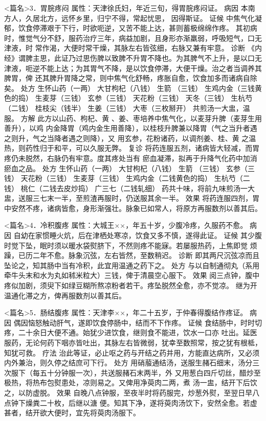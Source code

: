 \documentclass[a4paper,12pt,UTF8,twoside]{ctexbook}
\begin{document}
<篇名>3．胃脘疼闷
属性：天津徐氏妇，年近三旬，得胃脘疼闷证。 
病因 本南方人，久居北方，远怀乡里，归宁不得，常起忧思， 
因得斯证。 
证候 中焦气化凝郁，饮食停滞艰于下行，时欲呃逆，又苦不能上达，甚则蓄极绵绵作疼。 
其初病时，惟觉气分不舒，服药治疗三年，病益加剧，且身形亦渐羸弱，呼吸短气，口无津液，时 
常作渴，大便时常干燥，其脉左右皆弦细，右脉又兼有牢意。 
诊断 《内经》谓脾主思，此证乃过思伤脾以致脾不升胃不降也。为其脾气不上升，是以口无 
津液，呃逆不能上达；为其胃气不降，是以饮食停滞，大便干燥。治之者当调养其脾胃，俾 
还其脾升胃降之常，则中焦气化舒畅，疼胀自愈，饮食加多而诸病自除矣。 
处方 生怀山药（一两） 大甘枸杞（八钱） 生箭 （三钱） 
生鸡内金（三钱黄色的捣） 生麦芽（三钱） 玄参（三钱） 天花粉（三钱） 
天冬（三钱） 生杭芍（二钱） 桂枝尖（钱半） 生姜（三钱） 
大枣（三枚掰开） 
共煎汤一大盅，温服。 
方解 此方以山药、枸杞、黄 、姜、枣培养中焦气化，以麦芽升脾（麦芽生用善升），以鸡 
内金降胃（鸡内金生用善降），以桂枝升脾兼以降胃（气之当升者遇之则升，气之当降者遇之则降），又 
用玄参，花粉诸药，以调剂姜、桂、黄 之温热，则药性归于和平，可以久服无弊。 
复诊 将药连服五剂，诸病皆大轻减，而胃疼仍未脱然，右脉仍有牢意。度其疼处当有 
瘀血凝滞，拟再于升降气化药中加消瘀血之品。 
处方 生怀山药（一两） 大甘枸杞（八钱） 生箭 （三钱） 玄参（三钱） 
天花粉（三钱） 生麦芽（三钱） 生鸡内金（二钱黄色的捣） 
生杭芍（二钱） 桃仁（二钱去皮炒捣） 广三七（二钱轧细） 
药共十味，将前九味煎汤一大盅，送服三七末一半，至煎渣再服时，仍送服其余一半。 
效果 将药连服四剂，胃中安然不疼，诸病皆愈，身形渐强壮。脉象已如常人，将原方再服数剂以善其后。 


<篇名>4．冷积腹疼
属性：大城王××，年五十岁，少腹冷疼，久服药不愈。 
病因 自幼在家惯睡火炕，后在津栖处寒凉，饮食又多不慎，遂得此证。 
证候 其少腹时觉下坠，眠时须以暖水袋熨脐下，不然则疼不能寐。若屡服热药，上焦即觉 
烦躁，已历二年不愈。脉象沉弦，左右皆然，至数稍迟。 
诊断 即其两尺沉弦凉而且坠论之，知其肠中当有冷积，此宜用温通之药下之。 
处方 与以自制通彻丸（系用牵牛头末和水为丸如秫米粒大）三钱，俾于清晨空心服下。 
效果 阅三点钟，腹中疼似加剧，须臾下如绿豆糊所熬凉粉者若干。疼坠脱然全愈，亦不觉凉。 
继为开温通化滞之方，俾再服数剂以善其后。 


<篇名>5．肠结腹疼
属性：天津李××，年二十五岁，于仲春得腹结作疼证。 
病因 偶因恼怒触动肝气，遂即饮食停肠中，结而不下作疼。 
证候 食结肠中，时时切疼，二十余日大便不通。始犹少进饮食，继则食不能进，饮水一口亦 
吐出。延医服药，无论何药下咽亦皆吐出，其脉左右皆微弱，犹幸至数照常，按之犹有根柢，知犹可救。 
疗法 治此等证，必止呕之药与开结之药并用，方能直达病所，又必须内外兼治，则久停之结庶可下行。 
处方 用硝菔通结汤，送服生赭石细末，汤分三次服下（每五十分钟服一次），共送服赭石末两半，外 
又用葱白四斤切丝，醋炒至极热，将热布包熨患处，凉则易之。又俾用净萸肉二两，煮 
汤一盅，结开下后饮之，以防虚脱。 
效果 自晚八点钟服，至夜半时将药服完，炒葱外熨，至翌日早八点钟下燥粪二十枚，后继以溏 
便。知其下净，遂将萸肉汤饮下，安然全愈。若虚甚者，结开欲大便时，宜先将萸肉汤服下。 
\end{document}

